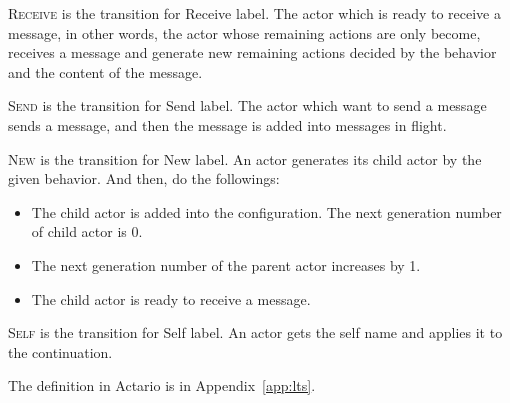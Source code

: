 \begin{description}[style=nextline,leftmargin=12pt,parsep=0pt]
\item[\textsc{Receive}]
  \textsc{Receive} is the transition for \textsf{Receive} label.
  The actor which is ready to receive a message, in other words, the actor whose remaining actions are only \textsf{become}, receives a message and generate new remaining actions decided by the behavior and the content of the message.
\item[\textsc{Send}]
  \textsc{Send} is the transition for \textsf{Send} label.
  The actor which want to send a message sends a message, and then the message is added into messages in flight.
\item[\textsc{New}]
  \textsc{New} is the transition for \textsf{New} label.
  An actor generates its child actor by the given behavior.
  And then, do the followings:
  \begin{itemize}
  \item The child actor is added into the configuration. The next generation number of child actor is 0.
  \item The next generation number of the parent actor increases by 1.
  \item The child actor is ready to receive a message.
  \end{itemize}
\item[\textsc{Self}]
  \textsc{Self} is the transition for \textsf{Self} label.
  An actor gets the self name and applies it to the continuation.
\end{description}

The definition in Actario is in Appendix~\ref{app:lts}.


